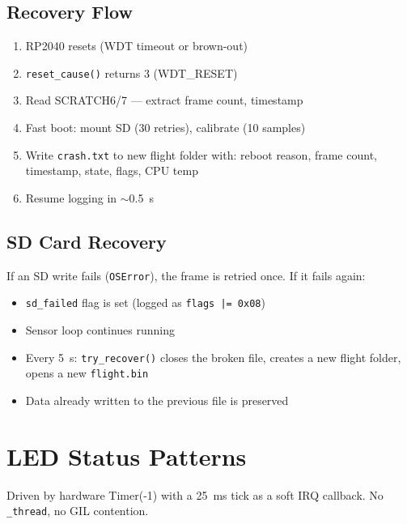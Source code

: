 \documentclass[11pt, a4paper, twoside]{article}
\newcommand{\file}[1]{\texttt{#1}}
\begin{document}
\subsection{Recovery Flow}

\begin{enumerate}
    \item RP2040 resets (WDT timeout or brown-out)
    \item \texttt{reset\_cause()} returns 3 (WDT\_RESET)
    \item Read SCRATCH6/7 --- extract frame count, timestamp
    \item Fast boot: mount SD (30 retries), calibrate (10 samples)
    \item Write \file{crash.txt} to new flight folder with: reboot reason, frame count, timestamp, state, flags, CPU temp
    \item Resume logging in $\sim$\SI{0.5}{\second}
\end{enumerate}

\subsection{SD Card Recovery}
\label{sec:sd-recovery}

If an SD write fails (\texttt{OSError}), the frame is retried once. If it fails again:
\begin{itemize}
    \item \texttt{sd\_failed} flag is set (logged as \texttt{flags |= 0x08})
    \item Sensor loop continues running
    \item Every \SI{5}{\second}: \texttt{try\_recover()} closes the broken file, creates a new flight folder, opens a new \file{flight.bin}
    \item Data already written to the previous file is preserved
\end{itemize}

\section{LED Status Patterns}
\label{sec:led}

Driven by hardware Timer(-1) with a \SI{25}{\milli\second} tick as a soft IRQ callback. No \texttt{\_thread}, no GIL contention.
\end{document}

